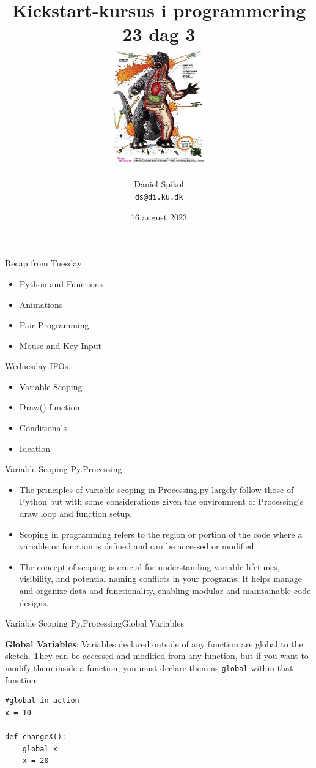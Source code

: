 \documentclass[10pt]{beamer}
\title[Kickstart-kursus] %
  {Kickstart-kursus i programmering 23 dag 3\\ \includegraphics[height=5cm]{images/gozz}} %
\author{\footnotesize{Daniel Spikol} \\
          \footnotesize{\texttt{ds@di.ku.dk}}}
\institute {DIKU \\ Københavns Universitet}
\date[16. august 2023]{16 august 2023}
\begin{document}
\begin{frame}[plain]
\titlepage
\end{frame}
\begin{frame}{Recap from Tuesday}
   	\begin{itemize}
	\item Python and Functions
	\item Animations
	\item Pair Programming
	\item Mouse and Key Input
	\end{itemize}
\end{frame}


\begin{frame}{Wednesday IFOs}
  \begin{itemize}
  \item Variable Scoping
   \item Draw() function
  \item Conditionals
  \item Ideation
  \end{itemize}
\end{frame}


\begin{frame}{Variable Scoping Py.Processing}
\begin{itemize}
\item The principles of variable scoping in Processing.py largely follow those
of Python but with some considerations given the environment of
Processing's draw loop and function setup.
\item Scoping in programming refers to the region or portion of the code where a variable or function is defined and can be accessed or modified. 
\item The concept of scoping is crucial for understanding variable lifetimes, visibility, and potential naming conflicts in your programs. It helps manage and organize data and functionality, enabling modular and maintainable code designs.
\end{itemize}
\end{frame}

\begin{frame}[fragile]{Variable Scoping Py.Processing}{Global Variables }

\textbf{Global Variables}: Variables declared outside of any function
are global to the sketch. They can be accessed and modified from any
function, but if you want to modify them inside a function, you must declare them as \texttt{global} within that function.

\begin{lstlisting}
#global in action
x = 10

def changeX():
    global x
    x = 20
\end{lstlisting}	
\end{frame}
\end{document}
